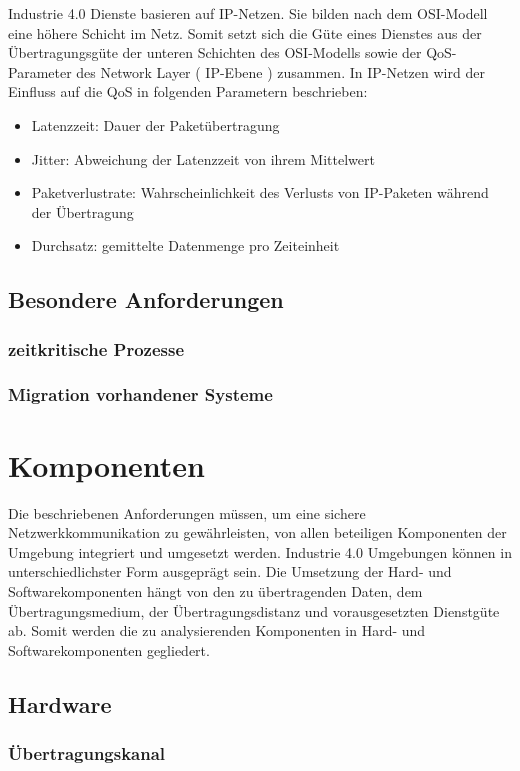 Industrie 4.0 Dienste basieren auf IP-Netzen. Sie bilden nach dem OSI-Modell eine höhere Schicht im Netz. Somit setzt sich die Güte eines Dienstes aus der Übertragungsgüte der unteren Schichten des  OSI-Modells sowie der \ac{QoS}-Parameter des Network Layer ( IP-Ebene ) zusammen. In IP-Netzen wird der Einfluss auf die \ac{QoS} in folgenden Parametern beschrieben:
\begin{itemize}
    \item Latenzzeit: Dauer der Paketübertragung
    \item Jitter: Abweichung der Latenzzeit von ihrem Mittelwert
    \item Paketverlustrate: Wahrscheinlichkeit des Verlusts von IP-Paketen während der Übertragung
    \item Durchsatz: gemittelte Datenmenge pro Zeiteinheit
\end{itemize}

\subsection{Besondere Anforderungen}
\subsubsection{zeitkritische Prozesse}
\subsubsection{Migration vorhandener Systeme}

\section{Komponenten}
Die beschriebenen Anforderungen müssen, um eine sichere Netzwerkkommunikation zu gewährleisten, von allen beteiligen Komponenten der Umgebung integriert und umgesetzt werden. Industrie 4.0 Umgebungen können in unterschiedlichster Form ausgeprägt sein. Die Umsetzung der Hard- und Softwarekomponenten hängt von den zu übertragenden Daten, dem Übertragungsmedium, der Übertragungsdistanz und vorausgesetzten Dienstgüte ab. Somit werden die zu analysierenden Komponenten in Hard- und Softwarekomponenten gegliedert.

\subsection{Hardware}
\subsubsection{Übertragungskanal}
